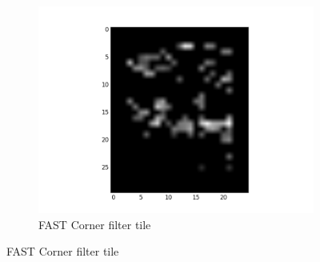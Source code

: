 \documentclass[fleqn,10pt]{SelfArx} %
\begin{document}
\begin{figure}
\begin{subfigure}[b]{0.3\textwidth}
                \includegraphics[width=\linewidth]{Figures/EdgeFigures/TileCorner.png}
                \caption{FAST Corner filter tile}
                \label{fig:CornerTile}
        \end{subfigure}%
        

\end{figure}
\end{document}
